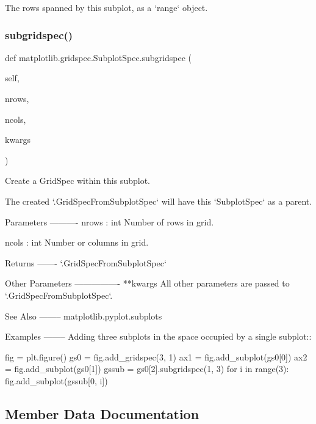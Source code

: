\begin{DoxyVerb}The rows spanned by this subplot, as a `range` object.\end{DoxyVerb}
 \mbox{\label{classmatplotlib_1_1gridspec_1_1SubplotSpec_acc03db846e1376e8b32b29a1f48119e3}} 
\subsubsection{\texorpdfstring{subgridspec()}{subgridspec()}}
{\footnotesize\ttfamily def matplotlib.\+gridspec.\+Subplot\+Spec.\+subgridspec (\begin{DoxyParamCaption}\item[{}]{self,  }\item[{}]{nrows,  }\item[{}]{ncols,  }\item[{}]{kwargs }\end{DoxyParamCaption})}

\begin{DoxyVerb}Create a GridSpec within this subplot.

The created `.GridSpecFromSubplotSpec` will have this `SubplotSpec` as
a parent.

Parameters
----------
nrows : int
    Number of rows in grid.

ncols : int
    Number or columns in grid.

Returns
-------
`.GridSpecFromSubplotSpec`

Other Parameters
----------------
**kwargs
    All other parameters are passed to `.GridSpecFromSubplotSpec`.

See Also
--------
matplotlib.pyplot.subplots

Examples
--------
Adding three subplots in the space occupied by a single subplot::

    fig = plt.figure()
    gs0 = fig.add_gridspec(3, 1)
    ax1 = fig.add_subplot(gs0[0])
    ax2 = fig.add_subplot(gs0[1])
    gssub = gs0[2].subgridspec(1, 3)
    for i in range(3):
fig.add_subplot(gssub[0, i])
\end{DoxyVerb}
 

\subsection{Member Data Documentation}
\mbox{\label{classmatplotlib_1_1gridspec_1_1SubplotSpec_a4923dcf21cfab5040c8e59909b988894}} 
